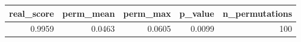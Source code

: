 \begin{tabular}{rrrrr}
\toprule
real_score & perm_mean & perm_max & p_value & n_permutations \\
\midrule
0.9959 & 0.0463 & 0.0605 & 0.0099 & 100 \\
\bottomrule
\end{tabular}

